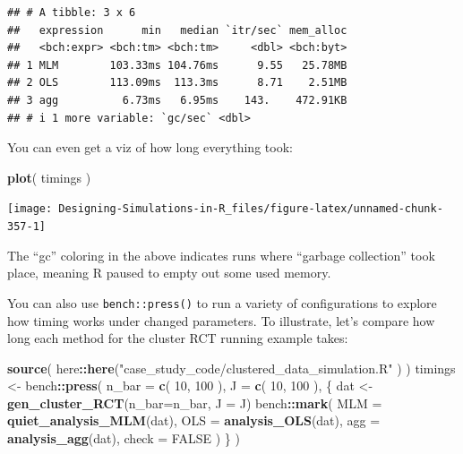 \documentclass[
]{book}
\newenvironment{Shaded}{\begin{snugshade}}{\end{snugshade}}
\newcommand{\AttributeTok}[1]{\textcolor[rgb]{0.13,0.29,0.53}{#1}}
\newcommand{\ConstantTok}[1]{\textcolor[rgb]{0.56,0.35,0.01}{#1}}
\newcommand{\DecValTok}[1]{\textcolor[rgb]{0.00,0.00,0.81}{#1}}
\newcommand{\FunctionTok}[1]{\textcolor[rgb]{0.13,0.29,0.53}{\textbf{#1}}}
\newcommand{\NormalTok}[1]{#1}
\newcommand{\OtherTok}[1]{\textcolor[rgb]{0.56,0.35,0.01}{#1}}
\newcommand{\SpecialCharTok}[1]{\textcolor[rgb]{0.81,0.36,0.00}{\textbf{#1}}}
\newcommand{\StringTok}[1]{\textcolor[rgb]{0.31,0.60,0.02}{#1}}
\begin{document}
\begin{verbatim}
## # A tibble: 3 x 6
##   expression      min   median `itr/sec` mem_alloc
##   <bch:expr> <bch:tm> <bch:tm>     <dbl> <bch:byt>
## 1 MLM        103.33ms 104.76ms      9.55   25.78MB
## 2 OLS        113.09ms  113.3ms      8.71    2.51MB
## 3 agg          6.73ms   6.95ms    143.    472.91KB
## # i 1 more variable: `gc/sec` <dbl>
\end{verbatim}

You can even get a viz of how long everything took:

\begin{Shaded}
\begin{Highlighting}[]
\FunctionTok{plot}\NormalTok{( timings )}
\end{Highlighting}
\end{Shaded}

\begin{center}\texttt{[image: Designing-Simulations-in-R\_files/figure-latex/unnamed-chunk-357-1]} \end{center}

The ``gc'' coloring in the above indicates runs where ``garbage collection'' took place, meaning R paused to empty out some used memory.

You can also use \texttt{bench::press()} to run a variety of configurations to explore how timing works under changed parameters.
To illustrate, let's compare how long each method for the cluster RCT running example takes:

\begin{Shaded}
\begin{Highlighting}[]
\FunctionTok{source}\NormalTok{( here}\SpecialCharTok{::}\FunctionTok{here}\NormalTok{(}\StringTok{"case\_study\_code/clustered\_data\_simulation.R"}\NormalTok{ ) )}
\NormalTok{timings }\OtherTok{\textless{}{-}}\NormalTok{ bench}\SpecialCharTok{::}\FunctionTok{press}\NormalTok{(}
  \AttributeTok{n\_bar =} \FunctionTok{c}\NormalTok{( }\DecValTok{10}\NormalTok{, }\DecValTok{100}\NormalTok{ ),}
  \AttributeTok{J =} \FunctionTok{c}\NormalTok{( }\DecValTok{10}\NormalTok{, }\DecValTok{100}\NormalTok{ ),}
\NormalTok{  \{}
\NormalTok{    dat }\OtherTok{\textless{}{-}} \FunctionTok{gen\_cluster\_RCT}\NormalTok{(}\AttributeTok{n\_bar=}\NormalTok{n\_bar, }\AttributeTok{J =}\NormalTok{ J)}
\NormalTok{    bench}\SpecialCharTok{::}\FunctionTok{mark}\NormalTok{(}
      \AttributeTok{MLM =} \FunctionTok{quiet\_analysis\_MLM}\NormalTok{(dat),}
      \AttributeTok{OLS =} \FunctionTok{analysis\_OLS}\NormalTok{(dat),}
      \AttributeTok{agg =} \FunctionTok{analysis\_agg}\NormalTok{(dat),}
      \AttributeTok{check =} \ConstantTok{FALSE}
\NormalTok{    )}
\NormalTok{  \}}
\NormalTok{)}
\end{Highlighting}
\end{Shaded}
\end{document}
